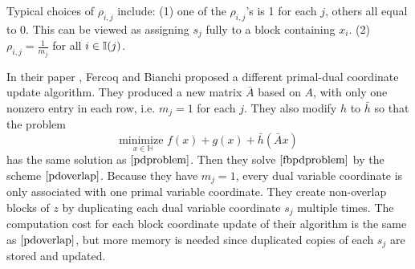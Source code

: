 {{{Typical choices of $\rho_{i,j}$ include: (1) one of the $\rho_{i,j}$'s is 1 for each $j$, others all equal to 0. This can be viewed as assigning $s_j$ fully to a block containing $x_i$.
(2) $\rho_{i,j}=\frac{1}{m_j}$ for all $i\in\mathbb{I}(j)$.

\begin{remark}
In their paper \cite{fercoq2015coordinate}, Fercoq and Bianchi proposed a different primal-dual coordinate update algorithm. 
They produced a new matrix $\bar{A}$ based on $A$, with only one nonzero entry in each row, i.e. $m_j=1$ for each $j$. They also modify $h$ to $\bar{h}$ so that the problem
\begin{equation}
\underset{x\in\mathbb{H}}{\text{minimize }} f(x)+g(x)+\bar{h}(\bar{A}x)\label{fbpdproblem}
\end{equation}
has the same solution as $\eqref{pdproblem}$. Then they solve $\eqref{fbpdproblem}$ by the scheme $\eqref{pdoverlap}$. Because they have $m_j=1$, every dual variable coordinate is only associated with one primal variable coordinate. 
They create non-overlap blocks of $z$ by duplicating each dual variable coordinate $s_j$ multiple times. The computation cost for each block coordinate update of their algorithm is the same as $\eqref{pdoverlap}$, but more memory is needed since duplicated copies of each $s_j$ are stored and updated.
\end{remark}

}}}
